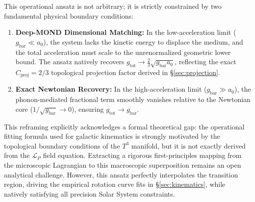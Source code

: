 \documentclass[aps,prd,10pt,twocolumn,superscriptaddress,nofootinbib,floatfix]{revtex4-2}
\begin{document}
This operational ansatz is not arbitrary; it is strictly constrained by two fundamental physical boundary conditions:
\begin{enumerate}
    \item \textbf{Deep-MOND Dimensional Matching:} In the low-acceleration limit ($g_{\text{bar}} \ll a_0$), the system lacks the kinetic energy to displace the medium, and the total acceleration must scale to the unrenormalized geometric lower bound. The ansatz natively recovers $g_{\text{tot}} \to \frac{2}{3}\sqrt{g_{\text{bar}}a_0}$, reflecting the exact $C_{\text{proj}} = 2/3$ topological projection factor derived in \S\ref{sec:projection}.
    \item \textbf{Exact Newtonian Recovery:} In the high-acceleration limit ($g_{\text{bar}} \gg a_0$), the phonon-mediated fractional term smoothly vanishes relative to the Newtonian core ($1/\sqrt{g_{\text{bar}}} \to 0$), ensuring $g_{\text{tot}} \to g_{\text{bar}}$.
\end{enumerate}

This reframing explicitly acknowledges a formal theoretical gap: the operational fitting formula used for galactic kinematics is strongly motivated by the topological boundary conditions of the $T^3$ manifold, but it is not exactly derived from the $\mathcal{L}_P$ field equation. Extracting a rigorous first-principles mapping from the microscopic Lagrangian to this macroscopic superposition remains an open analytical challenge. However, this ansatz perfectly interpolates the transition region, driving the empirical rotation curve fits in \S\ref{sec:kinematics}, while natively satisfying all precision Solar System constraints.
\end{document}

